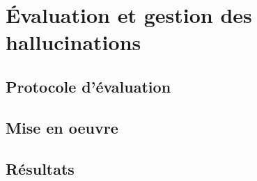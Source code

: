 \chapter{Évaluation et gestion des hallucinations}


\section{Protocole d'évaluation}

\section{Mise en oeuvre}

\section{Résultats}


